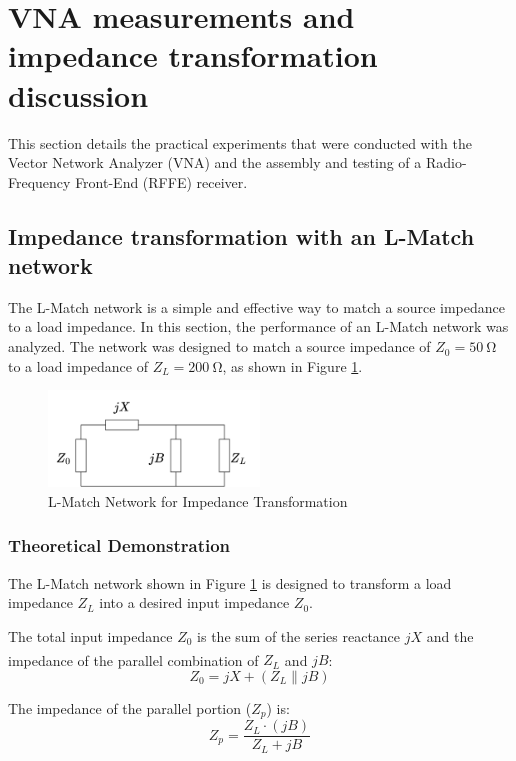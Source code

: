 \section{VNA measurements and impedance transformation discussion} 

This section details the practical experiments that were conducted with the Vector Network Analyzer (VNA) and the assembly and testing of a Radio-Frequency Front-End (RFFE) receiver. 

\subsection{Impedance transformation with an L-Match network}

The L-Match network is a simple and effective way to match a source impedance to a load impedance. In this section, the performance of an L-Match network was analyzed. The network was designed to match a source impedance of \( Z_0 = \SI{50}{\ohm} \) to a load impedance of \( Z_L = \SI{200}{\ohm} \), as shown in Figure \ref{fig:match_network}.

\begin{figure}[H]
    \centering
    \includegraphics[width=0.5\textwidth]{Images/input-matching.png}
    \caption{L-Match Network for Impedance Transformation}
    \label{fig:match_network}
\end{figure}

\subsubsection{Theoretical Demonstration}
The L-Match network shown in Figure \ref{fig:match_network} is designed to transform a load impedance $Z_L$ into a desired input impedance $Z_{0}$. 

The total input impedance $Z_{0}$ is the sum of the series reactance $jX$ and the impedance of the parallel combination of $Z_L$ and $jB$\textsuperscript{\cite{Gillermo-Gonzalez}}:
\begin{equation}
    Z_{0} = jX + (Z_L \parallel jB)
\end{equation}

The impedance of the parallel portion ($Z_p$) is:
\begin{equation}
    Z_p = \frac{Z_L \cdot (jB)}{Z_L + jB}
\end{equation}

